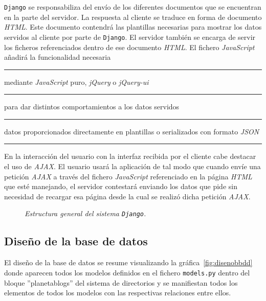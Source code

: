 \documentclass[a4paper, 12pt]{book}
\begin{document}
\texttt{Django} se responsabiliza del env\'io de los diferentes documentos que se encuentran en la parte del servidor. La respuesta al cliente se traduce
en forma de documento \textit{HTML}. Este documento contendr\'a las plantillas necesarias para mostrar los datos servidos al cliente por parte de 
\texttt{Django}. El servidor tambi\'en se encarga de servir los ficheros referenciados dentro de ese documento \textit{HTML}. El fichero \textit{JavaScript}
a\~nadir\'a la funcionalidad necesaria \rule[1mm]{4mm}{0.1mm}mediante \textit{JavaScript} puro, \textit{jQuery} o \textit{jQuery-ui}\rule[1mm]{4mm}{0.1mm}
para dar distintos comportamientos a los datos servidos \rule[1mm]{4mm}{0.1mm}datos proporcionados directamente en plantillas o serializados con formato
\textit{JSON}\rule[1mm]{4mm}{0.1mm}

En la interacci\'on del usuario con la interfaz recibida por el cliente cabe destacar el uso de \textit{AJAX}. El usuario usar\'a la aplicaci\'on de tal
modo que cuando env\'ie una petici\'on \textit{AJAX} a trav\'es del fichero \textit{JavaScript} referenciado en la p\'agina \textit{HTML} que est\'e manejando,
el servidor contestar\'a enviando los datos que pide sin necesidad de recargar esa p\'agina desde la cual se realiz\'o dicha petici\'on \textit{AJAX}.
\begin{figure}
  \centering
  \caption{\textit{Estructura general del sistema \texttt{Django}.}}
  \label{fig:introestructura}
\end{figure}


\subsection{Dise\~no de la base de datos} 
\label{sec:disenobbdd}
El dise\~no de la base de datos se resume visualizando la gr\'afica~\ref{fig:disenobbdd} donde aparecen todos los modelos definidos en el fichero 
\texttt{models.py} dentro del bloque ''planetablogs'' del sistema de directorios y se manifiestan todos los elementos de todos los modelos con las
respectivas relaciones entre ellos. 
\end{document}
